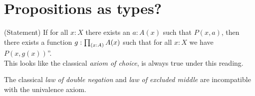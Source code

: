 \documentclass[hott-all.tex]{subfiles}
\begin{document}
\section{Propositions as types?}
%
\begin{rmk}
(Statement)
If for all $x:X$ there exists an $a:A(x)$ such that $P(x,a)$, then there exists
a function $g:\prd{x:A} A(x)$ such that for all $x:X$ we have $P(x,g(x))$''.\\

This looks like the classical \emph{axiom of
choice}, is always true under this reading.
\end{rmk}
%
\begin{rmk}
The classical \emph{law of double negation} and \emph{law of excluded middle} are incompatible with the univalence axiom.
\end{rmk}
\end{document}
